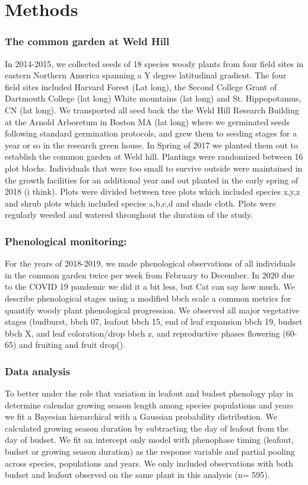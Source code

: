 \documentclass[12 pt]{article}
\begin{document}
\section{Methods}
\subsubsection{The common garden at Weld Hill}
In 2014-2015, we collected seeds of 18 species woody plants from four field sites in eastern Northern America spanning a Y degree latitudinal gradient. The four field sites included Harvard Forest (Lat long), the Second College Grant of Dartmouth College (lat long) White mountains (lat long) and St. Hippopotamus, CN (lat long). We transported all seed back the the Weld Hill Research Building at the Arnold Arboretum in Boston MA (lat long) where we germinated seeds following standard germination protocols, and grew them to seeding stages for a year or so in the research green house. In Spring of 2017 we planted them out to establish the common garden at Weld hill. Plantings were randomized between 16 plot blocks. Individuals that were too small to survive outside were maintained in the growth facilities for an additional year and out planted in the early spring of 2018 (i think). Plots were divided between tree plots which included species x,y,z and shrub plots which included species a,b,c,d and shade cloth. Plots were regularly weeded and watered throughout the duration of the study.

\subsubsection{Phenological monitoring:}
For the years of 2018-2019, we made phenological observations of all individuals in the common garden twice per week from February to December. In 2020 due to the COVID 19 pandemic we did it a bit less, but Cat can say how much. We describe phenological stages using a modified bbch scale \citep{} a common metrics for quantify woody plant phenological progression. We observed all major vegetative stages (budburst, bbch 07, leafout bbch 15, end of leaf expansion bbch 19, budset bbch X, and leaf coloration/drop bbch z, and reproductive phases flowering (60-65) and fruiting and fruit drop(). 

\subsubsection{Data analysis}
To better under the role that variation in leafout and budset phenology play in determine calendar growing season length among species populations and years we fit a Bayesian hierarchical with a Gaussian probability distribution. We calculated growing season duration by subtracting the day of leafout from the day of budset. We fit an intercept only model with phenophase timing (leafout, budset or growing season duration) as the response variable and partial pooling across species, populations and years. We only included observations with both budset and leafout observed on the same plant in this analysis (n= 595).
\end{document}
